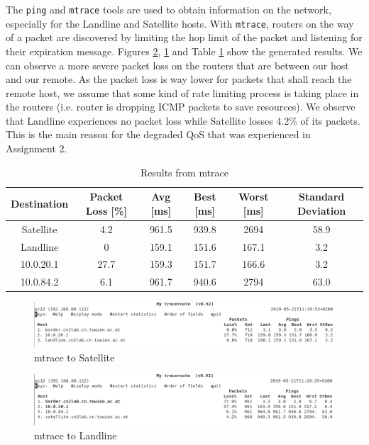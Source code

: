 \documentclass[parskip=full]{scrartcl}
\begin{document}
The \texttt{ping} and \texttt{mtrace} tools are used to obtain information on the network, especially for the Landline and Satellite hosts.
With \texttt{mtrace}, routers on the way of a packet are discovered by limiting the hop limit of the packet and listening for their expiration message.
Figures \ref{fig:mtraceLandline}, \ref{fig:mtraceSatellite} and Table \ref{tbl:mtraceResults} show the generated results.
We can observe a more severe packet loss on the routers that are between our host and our remote. 
As the packet loss is way lower for packets that shall reach the remote host, we assume that some kind of rate limiting process is taking place in the routers (i.e. router is dropping ICMP packets to save resources).
We observe that Landline experiences no packet loss while Satellite losses 4.2\% of its packets. 
This is the main reason for the degraded QoS that was experienced in Assignment 2.

\begin{table}[hb]
    \centering
    \caption{Results from mtrace}
    \label{tbl:mtraceResults}
    \begin{tabular}{cccccc}
        \toprule
        Destination & Packet Loss [\%] & Avg [ms] & Best [ms] & Worst [ms] & Standard Deviation  \\ \midrule
        Satellite & 4.2 & 961.5 & 939.8 & 2694 & 58.9 \\
        Landline & 0 & 159.1 & 151.6 & 167.1 & 3.2\\
        10.0.20.1 & 27.7 & 159.3 & 151.7 & 166.6 & 3.2\\
        10.0.84.2 & 6.1 & 961.7 & 940.6 & 2794 & 63.0\\
        \bottomrule
    \end{tabular}
\end{table}

\begin{figure}[ht]
    \centering
   \includegraphics[width=\textwidth]{images/mytraceroute1.png} 
    \caption{mtrace to Satellite}
    \label{fig:mtraceSatellite}
\end{figure}

\begin{figure}[ht]
    \centering
   \includegraphics[width=\textwidth]{images/mytraceroute2.png} 
    \caption{mtrace to Landline}
    \label{fig:mtraceLandline}
\end{figure}
\end{document}
